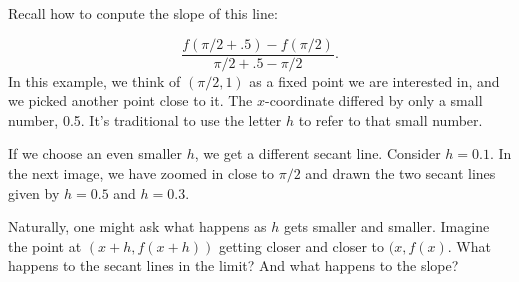 \documentclass[11pt]{book}
\numberwithin{example}{chapter}
\begin{document}
Recall how to conpute the slope of this line:

$$\frac{f(\pi/2+.5) - f(\pi/2)}{\pi/2+.5 - \pi/2}.$$
In this example, we think of $(\pi/2,1)$ as a fixed point we are interested in, and we picked another point close to it.  The $x$-coordinate differed by only a small number, 0.5.  It's traditional to use the letter $h$ to refer to that small number.  

If we choose an even smaller $h$, we get a different secant line.  Consider $h=0.1$.  In the next image, we have zoomed in close to $\pi/2$ and drawn the two secant lines given by $h=0.5$ and $h=0.3$.  


\begin{center}
\end{center}

Naturally, one might ask what happens as $h$ gets smaller and smaller.  Imagine the point at $(x+h,f(x+h))$ getting closer and closer to $(x,f(x)$.  What happens to the secant lines in the limit?  And what happens to the slope?  
\end{document}
